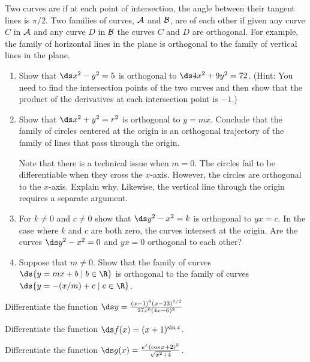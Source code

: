\begin{enumialphparenastyle}
\begin{ex}  
Two curves are  if at each point of intersection,
the angle between their tangent lines is $\pi/2$. Two
families of curves, $\cal{A}$ and $\cal{B}$, are
 of each other if given any curve $C$
in $\cal{A}$ and any curve $D$ in $\cal{B}$ the curves $C$
and $D$ are orthogonal.
For example, the family of horizontal lines in the plane is
orthogonal to the family of vertical lines in the plane.
\begin{enumerate}
	\item	Show that $\ds x^2 -y^2 =5$ is orthogonal to $\ds 4x^2 +9y^2
	=72$. (Hint: You need to find the intersection points of the two
	curves and then show that the product of the derivatives at each
	intersection point is $-1$.)
	\item	Show that $\ds x^2 +y^2 = r^2$ is orthogonal to
	$y=mx$. Conclude that the family of circles centered at the origin is
	an orthogonal trajectory of the family of lines that pass through the
	origin.
	
	Note that there is a technical issue when $m=0$. The circles fail to
	be differentiable when they cross the $x$-axis. However, the circles
	are orthogonal to the $x$-axis. Explain why. Likewise, the vertical
	line through the origin requires a separate argument.
	\item	For $k\not= 0$ and $c \neq 0$ show that $\ds y^2 -x^2 =k$ is orthogonal to
	$yx =c$. In the case where $k$ and $c$ are both zero, the curves
	intersect at the origin. Are the curves $\ds y^2 -x^2 =0$ and $yx=0$
	orthogonal to each other?
	\item	Suppose that $m\neq 0$. Show that the family of curves
	$\ds \{y=mx+b \mid b\in \R \}$ is orthogonal to the
	family of curves $\ds \{y=-(x/m)+c \mid c \in \R\}$.
\end{enumerate}
\end{ex}

\begin{ex} 
Differentiate the function $\ds y={(x-1)^8 (x-23)^{1/2}\over 27 x^6(4x-6)^8 }$
\end{ex}

\begin{ex}
Differentiate the function $\ds f(x)=(x+1)^{\sin x}$.
\end{ex}

\begin{ex}
Differentiate the function $\ds g(x)=\frac{e^x(\cos x+2)^3}{\sqrt{x^2+4}}$.
\end{ex}

\end{enumialphparenastyle}